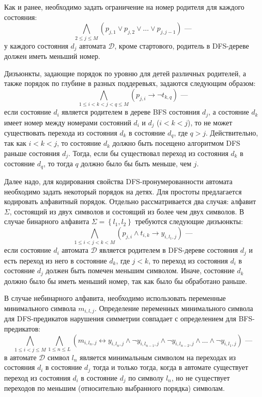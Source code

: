 Как и ранее, необходимо задать ограничение на номер родителя для каждого состояния:
\begin{equation*}
  \bigwedge_{2 \leq j \leq M} \left(p_{j,1} \vee p_{j,2} \vee \ldots \vee p_{j,j - 1}\right) \text{~---}
\end{equation*}
у каждого состояния $d_{j}$ автомата $\mathcal{D}$, кроме стартового, родитель в DFS-дереве должен иметь меньший номер. 

Дизъюнкты, задающие порядок по уровню для детей различных родителей, а также порядок по глубине в разных поддеревьях, задаются следующим образом:
\begin{equation*}
  \bigwedge\limits_{1 \leq i < k < j < q \leq M} (p_{j,i} \rightarrow \neg t_{k,q}) \text{~---}
\end{equation*}
если состояние $d_{i}$ является родителем в дереве BFS состояния $d_{j}$, а состояние $d_{k}$ имеет номер между номерами состояний $d_{i}$ и $d_{j}$ ($i < k < j$), то не может существовать перехода из состояния $d_{k}$ в состояние $d_{q}$, где $q > j$.
Действительно, так как $i < k < j$, то состояние $d_{k}$ должно быть посещено алгоритмом DFS раньше состояния $d_{j}$.
Тогда, если бы существовал переход из состояния $d_{k}$ в состояние $d_{q}$, то тогда $q$ должно было бы быть меньше, чем $j$.

Далее надо, для кодирования свойства DFS-пронумерованности автомата необходимо задать некоторый порядок на детях.
Для простоты предлагается кодировать алфавитный порядок.
Отдельно рассматривается два случая: алфавит $\Sigma$, состоящий из двух символов и состоящий из более чем двух символов.
В случае бинарного алфавита $\Sigma = \left\{l_{1},l_{2}\right\}$ требуются следующие дизъюнкты:
\begin{equation*}
  \bigwedge\limits_{1 \leq i < j < k < M} (p_{j,i} \wedge t_{i,k} \rightarrow y_{i,l_{1},j})\text{~---}
\end{equation*}
если состояние $d_{i}$ автомата $\mathcal{D}$ является родителем в DFS-дереве состояния $d_{j}$ и есть переход из него в состояние $d_{k}$, где $j < k$, то переход из состояния $d_{i}$ в состояние $d_{j}$ должен быть помечен меньшим символом. Иначе, состояние $d_{k}$ должно было бы иметь меньший номер, так как было бы обработано раньше.

В случае небинарного алфавита, необходимо использовать переменные минимального символа $m_{i,l,j}$.
Определение переменных минимального символа для DFS-предикатов нарушения симметрии совпадает с определением для BFS-предикатов:
\begin{equation*}
  \bigwedge_{1 \leq i < j \leq M} \bigwedge_{1 \leq n \leq L} \left(m_{i,l_{n},j} \leftrightarrow y_{i,l_{n},j} \wedge \neg y_{i,l_{n - 1}, j} \wedge \neg y_{i,l_{n - 2}, j} \wedge \ldots \wedge \neg y_{i,l_{1},j} \right)\text{~---}
\end{equation*}
в автомате $\mathcal{D}$ символ $l_{n}$ является минимальным символом на переходах из состояния $d_{i}$ в состояние $d_{j}$ тогда и только тогда, когда в автомате существует переход из состояния $d_{i}$ в состояние $d_{j}$ по символу $l_{n}$, но не существует переходов по меньшим (относительно выбранного порядка) символам.

